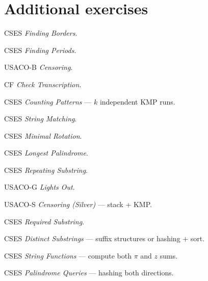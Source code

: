 \section{Additional exercises}
\begin{exercise}[easy] CSES \emph{Finding Borders}. \end{exercise}
\begin{exercise}[easy] CSES \emph{Finding Periods}. \end{exercise}
\begin{exercise}[easy] USACO-B \emph{Censoring}. \end{exercise}
\begin{exercise}[easy] CF \emph{Check Transcription}. \end{exercise}
\begin{exercise}[easy] CSES \emph{Counting Patterns} --- $k$ independent KMP runs. \end{exercise}
\begin{exercise}[medium] CSES \emph{String Matching}. \end{exercise}
\begin{exercise}[medium] CSES \emph{Minimal Rotation}. \end{exercise}
\begin{exercise}[medium] CSES \emph{Longest Palindrome}. \end{exercise}
\begin{exercise}[medium] CSES \emph{Repeating Substring}. \end{exercise}
\begin{exercise}[medium] USACO-G \emph{Lights Out}. \end{exercise}
\begin{exercise}[medium] USACO-S \emph{Censoring (Silver)} --- stack + KMP. \end{exercise}
\begin{exercise}[hard] CSES \emph{Required Substring}. \end{exercise}
\begin{exercise}[hard] CSES \emph{Distinct Substrings} --- suffix structures or hashing + sort. \end{exercise}
\begin{exercise}[hard] CSES \emph{String Functions} --- compute both $\pi$ and $z$ sums. \end{exercise}
\begin{exercise}[hard] CSES \emph{Palindrome Queries} --- hashing both directions. \end{exercise}

